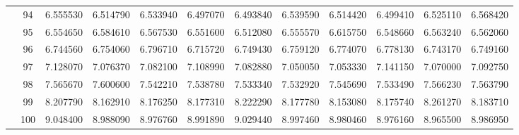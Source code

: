 \begin{table}[h]
{\begin{tabular}{cc|cccccccccc}
\multicolumn{1}{|c|}{} & 94 & 6.555530 & 6.514790 & 6.533940 & 6.497070 & 6.493840 & 6.539590 & 6.514420 & 6.499410 & 6.525110 & 6.568420 \\ \cline{2-2}
\multicolumn{1}{|c|}{} & 95 & 6.554650 & 6.584610 & 6.567530 & 6.551600 & 6.512080 & 6.555570 & 6.615750 & 6.548660 & 6.563240 & 6.562060 \\ \cline{2-2}
\multicolumn{1}{|c|}{} & 96 & 6.744560 & 6.754060 & 6.796710 & 6.715720 & 6.749430 & 6.759120 & 6.774070 & 6.778130 & 6.743170 & 6.749160 \\ \cline{2-2}
\multicolumn{1}{|c|}{} & 97 & 7.128070 & 7.076370 & 7.082100 & 7.108990 & 7.082880 & 7.050050 & 7.053330 & 7.141150 & 7.070000 & 7.092750 \\ \cline{2-2}
\multicolumn{1}{|c|}{} & 98 & 7.565670 & 7.600600 & 7.542210 & 7.538780 & 7.533340 & 7.532920 & 7.545690 & 7.533490 & 7.566230 & 7.563790 \\ \cline{2-2}
\multicolumn{1}{|c|}{} & 99 & 8.207790 & 8.162910 & 8.176250 & 8.177310 & 8.222290 & 8.177780 & 8.153080 & 8.175740 & 8.261270 & 8.183710 \\ \cline{2-2}
\multicolumn{1}{|c|}{} & 100 & 9.048400 & 8.988090 & 8.976760 & 8.991890 & 9.029440 & 8.997460 & 8.980460 & 8.976160 & 8.965500 & 8.986950 \\ \cline{1-2}
\end{tabular}%
}
\end{table}

\begin{table}[h]
\centering
{}
\end{table}

